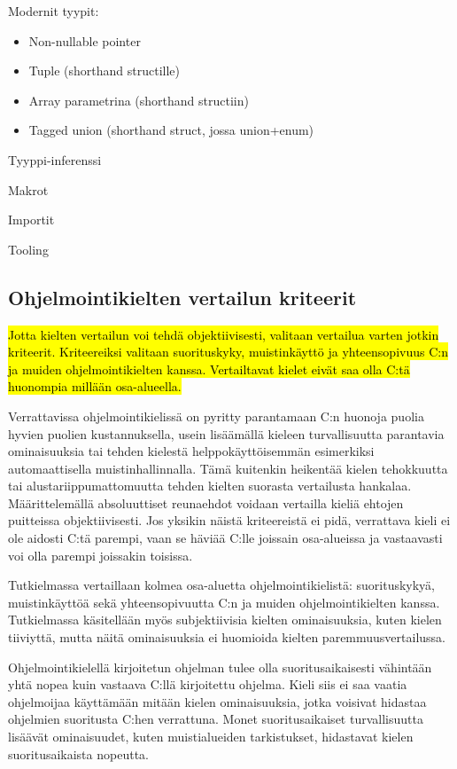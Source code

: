 Modernit tyypit:
\begin{itemize}
    \item Non-nullable pointer
    \item Tuple (shorthand structille)
    \item Array parametrina (shorthand structiin)
    \item Tagged union (shorthand struct, jossa union+enum)
\end{itemize}

Tyyppi-inferenssi

Makrot

Importit

Tooling

\subsection{Ohjelmointikielten vertailun kriteerit}
\label{sec:abs}

\hl{Jotta kielten vertailun voi tehdä objektiivisesti, valitaan vertailua
varten jotkin kriteerit. Kriteereiksi valitaan suorituskyky, muistinkäyttö ja
yhteensopivuus C:n ja muiden ohjelmointikielten kanssa. Vertailtavat kielet
eivät saa olla C:tä huonompia millään osa-alueella.}

Verrattavissa ohjelmointikielissä on pyritty parantamaan C:n huonoja puolia
hyvien puolien kustannuksella, usein lisäämällä kieleen turvallisuutta
parantavia ominaisuuksia tai tehden kielestä helppokäyttöisemmän esimerkiksi
automaattisella muistinhallinnalla. Tämä kuitenkin heikentää kielen tehokkuutta
tai alustariippumattomuutta tehden kielten suorasta vertailusta hankalaa.
Määrittelemällä absoluuttiset reunaehdot voidaan vertailla kieliä ehtojen
puitteissa objektiivisesti. Jos yksikin näistä kriteereistä ei pidä, verrattava
kieli ei ole aidosti C:tä parempi, vaan se häviää C:lle joissain osa-alueissa
ja vastaavasti voi olla parempi joissakin toisissa.

Tutkielmassa vertaillaan kolmea osa-aluetta ohjelmointikielistä: suorituskykyä,
muistinkäyttöä sekä yhteensopivuutta C:n ja muiden ohjelmointikielten kanssa.
Tutkielmassa käsitellään myös subjektiivisia kielten ominaisuuksia, kuten
kielen tiiviyttä, mutta näitä
ominaisuuksia ei huomioida kielten paremmuusvertailussa.

Ohjelmointikielellä kirjoitetun ohjelman tulee olla suoritusaikaisesti
vähintään yhtä nopea kuin vastaava C:llä kirjoitettu ohjelma. Kieli siis ei saa
vaatia ohjelmoijaa käyttämään mitään kielen ominaisuuksia, jotka voisivat
hidastaa ohjelmien suoritusta C:hen verrattuna. Monet suoritusaikaiset
turvallisuutta lisäävät ominaisuudet, kuten muistialueiden tarkistukset,
hidastavat kielen suoritusaikaista nopeutta.

